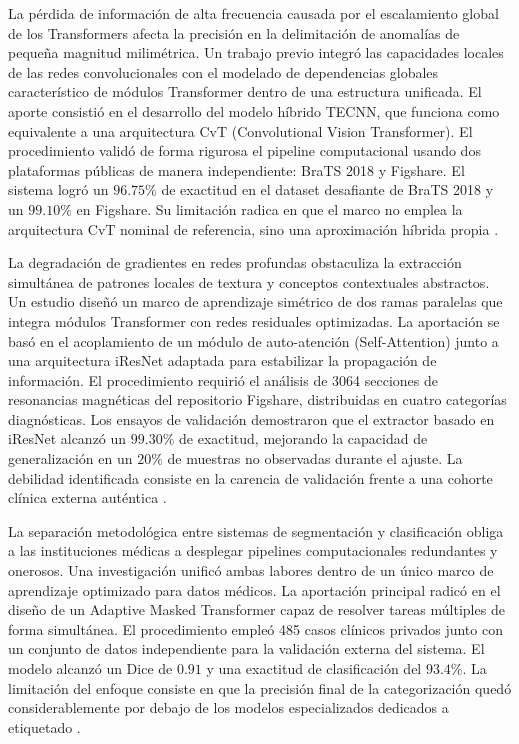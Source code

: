 La pérdida de información de alta frecuencia causada por el escalamiento global de los Transformers afecta la precisión en la delimitación de anomalías de pequeña magnitud milimétrica. Un trabajo previo integró las capacidades locales de las redes convolucionales con el modelado de dependencias globales característico de módulos Transformer dentro de una estructura unificada. El aporte consistió en el desarrollo del modelo híbrido TECNN, que funciona como equivalente a una arquitectura CvT (Convolutional Vision Transformer). El procedimiento validó de forma rigurosa el pipeline computacional usando dos plataformas públicas de manera independiente: BraTS 2018 y Figshare. El sistema logró un $96.75\%$ de exactitud en el dataset desafiante de BraTS 2018 y un $99.10\%$ en Figshare. Su limitación radica en que el marco no emplea la arquitectura CvT nominal de referencia, sino una aproximación híbrida propia \cite{Aloraini2023}.

La degradación de gradientes en redes profundas obstaculiza la extracción simultánea de patrones locales de textura y conceptos contextuales abstractos. Un estudio diseñó un marco de aprendizaje simétrico de dos ramas paralelas que integra módulos Transformer con redes residuales optimizadas. La aportación se basó en el acoplamiento de un módulo de auto-atención (Self-Attention) junto a una arquitectura iResNet adaptada para estabilizar la propagación de información. El procedimiento requirió el análisis de 3064 secciones de resonancias magnéticas del repositorio Figshare, distribuidas en cuatro categorías diagnósticas. Los ensayos de validación demostraron que el extractor basado en iResNet alcanzó un $99.30\%$ de exactitud, mejorando la capacidad de generalización en un $20\%$ de muestras no observadas durante el ajuste. La debilidad identificada consiste en la carencia de validación frente a una cohorte clínica externa auténtica \cite{Tabatabaei2023}.

La separación metodológica entre sistemas de segmentación y clasificación obliga a las instituciones médicas a desplegar pipelines computacionales redundantes y onerosos. Una investigación unificó ambas labores dentro de un único marco de aprendizaje optimizado para datos médicos. La aportación principal radicó en el diseño de un Adaptive Masked Transformer capaz de resolver tareas múltiples de forma simultánea. El procedimiento empleó 485 casos clínicos privados junto con un conjunto de datos independiente para la validación externa del sistema. El modelo alcanzó un Dice de $0.91$ y una exactitud de clasificación del $93.4\%$. La limitación del enfoque consiste en que la precisión final de la categorización quedó considerablemente por debajo de los modelos especializados dedicados a etiquetado \cite{Lv2025}.

